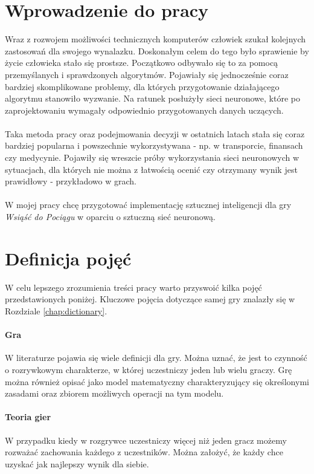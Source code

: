 \documentclass[12pt, oneside]{report}
\begin{document}
\section{Wprowadzenie do pracy}
Wraz z rozwojem możliwości technicznych komputerów człowiek szukał kolejnych zastosowań dla swojego wynalazku. Doskonałym celem do tego było sprawienie by życie człowieka stało się prostsze. Początkowo odbywało się to za pomocą przemyślanych i sprawdzonych algorytmów. Pojawiały się jednocześnie coraz bardziej skomplikowane problemy, dla których przygotowanie działającego algorytmu stanowiło wyzwanie. Na ratunek posłużyły sieci neuronowe, które po zaprojektowaniu wymagały odpowiednio przygotowanych danych uczących. \\ \\
Taka metoda pracy oraz podejmowania decyzji w ostatnich latach stała się coraz bardziej popularna i powszechnie wykorzystywana - np. w transporcie, finansach czy medycynie. Pojawiły się wreszcie próby wykorzystania sieci neuronowych w sytuacjach, dla których nie można z łatwością ocenić czy otrzymany wynik jest prawidłowy - przykładowo w grach. \\ \\ 
W mojej pracy chcę przygotować implementację sztucznej inteligencji dla gry \textit{Wsiąść do Pociągu} w oparciu o sztuczną sieć neuronową. 
\section{Definicja pojęć}
\label{section:Definitions}
W celu lepszego zrozumienia treści pracy warto przyswoić kilka pojęć przedstawionych poniżej. Kluczowe pojęcia dotyczące samej gry znalazły się w Rozdziale \ref{chap:dictionary}.
\paragraph{Gra} W literaturze pojawia się wiele definicji dla gry. Można uznać, że jest to czynność o rozrywkowym charakterze, w której uczestniczy jeden lub wielu graczy. Grę można również opisać jako model matematyczny charakteryzujący się określonymi zasadami oraz zbiorem możliwych operacji na tym modelu.
\paragraph{Teoria gier} W przypadku kiedy w rozgrywce uczestniczy więcej niż jeden gracz możemy rozważać zachowania każdego z uczestników. Można założyć, że każdy chce uzyskać jak najlepszy wynik dla siebie.
\end{document}
